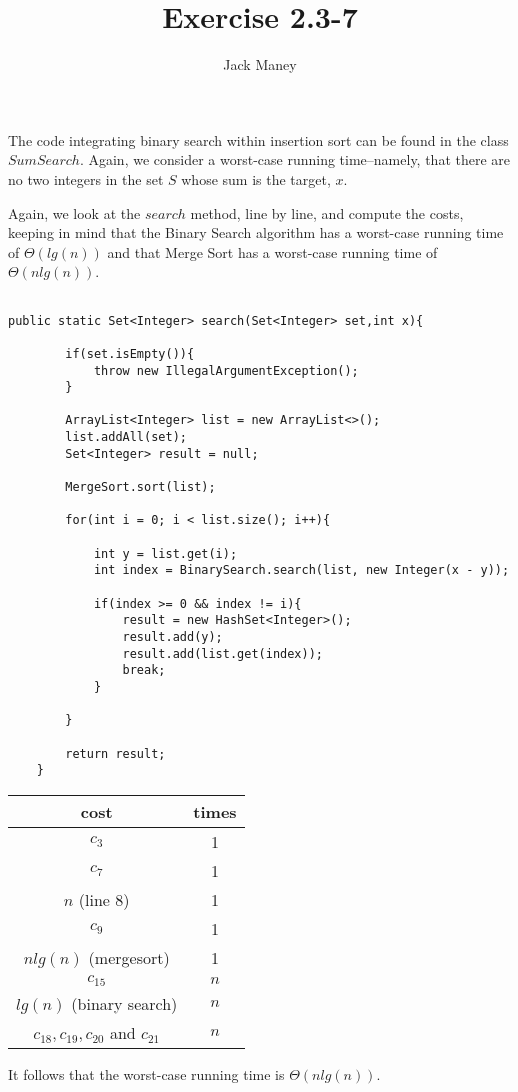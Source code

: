\documentclass{article}
\begin{document}
\title{Exercise 2.3-7}
\author{Jack Maney}
\maketitle

The code integrating binary search within insertion sort can be found in the class $SumSearch$. Again, we consider a worst-case running time--namely, that there are no two integers in the set $S$ whose sum is the target, $x$.

Again, we look at the $search$ method, line by line, and compute the costs, keeping in mind that the Binary Search algorithm has a worst-case running time of $\Theta(lg(n))$ and that Merge Sort has a worst-case running time of $\Theta(n lg(n))$.

\begin{verbatim}

public static Set<Integer> search(Set<Integer> set,int x){
		
		if(set.isEmpty()){
			throw new IllegalArgumentException();
		}
		
		ArrayList<Integer> list = new ArrayList<>();
		list.addAll(set);
		Set<Integer> result = null;
		
		MergeSort.sort(list);
		
		for(int i = 0; i < list.size(); i++){
			
			int y = list.get(i);
			int index = BinarySearch.search(list, new Integer(x - y));
			
			if(index >= 0 && index != i){
				result = new HashSet<Integer>();
				result.add(y);
				result.add(list.get(index));
				break;
			}
			
		}
		
		return result;
	}
\end{verbatim}

\begin{tabular}{|c|c|}
\hline 
cost & times \\ 
\hline 
$c_3$ & 1 \\ 
\hline 
$c_7$ & 1 \\ 
\hline 
$n$ (line 8)& 1 \\ 
\hline 
$c_9$ & 1 \\ 
\hline 
$n lg(n)$ (mergesort) & 1 \\ 
\hline 
$c_{15}$ & $n$ \\ 
\hline 
$lg(n)$ (binary search) & $n$ \\
\hline
$c_{18}, c_{19}, c_{20}$ and $c_{21}$ & $n$ \\
\hline 
\end{tabular} 

\bigskip

\noindent It follows that the worst-case running time is $\Theta(n lg(n))$.
\end{document}
